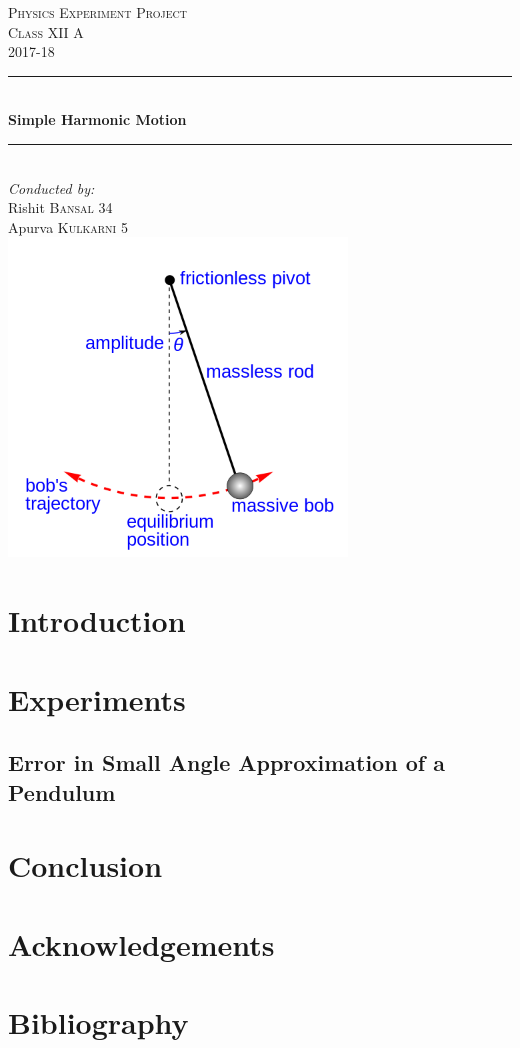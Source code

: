 \documentclass[12pt]{report}
\numberwithin{equation}{section}
\begin{document}
\begin{titlepage}
  
\newcommand{\HRule}{\rule{\linewidth}{0.5mm}}

\center
\vspace*{3cm} 

\textsc{\LARGE Physics Experiment Project}\\[1.5cm]
\textsc{\Large Class XII A}\\[0.5cm]
\textsc{\large 2017-18}\\[0.5cm]


\HRule \\[0.4cm]
{ \huge \bfseries Simple Harmonic Motion}\\[0.4cm]
\HRule \\[1.5cm]
 

\Large \emph{Conducted by:}\\
\large Rishit \textsc{Bansal 34}\\
\large Apurva \textsc{Kulkarni 5}\\[2cm]

\includegraphics[width=9cm]{title2}
\vfill

\end{titlepage}

\tableofcontents
\chapter{Introduction}


\chapter{Experiments}
\section{Error in Small Angle Approximation of a Pendulum}

\chapter{Conclusion}

\chapter{Acknowledgements}

\chapter{Bibliography}

\end{document}
